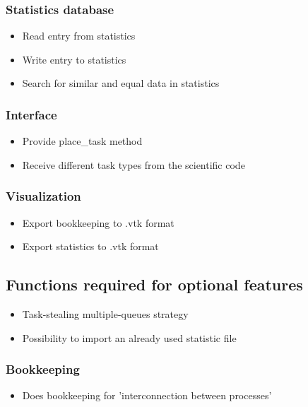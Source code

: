 {		\subsubsection{Statistics database}
	
			\begin{itemize}
				
				\item Read entry from statistics
				\item Write entry to statistics
				\item Search for similar and equal data in statistics
			\end{itemize}
	
	
	\subsubsection{Interface}
	
		\begin{itemize}
			\item Provide place\_task method
			\item Receive different task types from the scientific code
		\end{itemize}
		
		
	\subsubsection{Visualization}
	
		\begin{itemize}
			\item Export bookkeeping to .vtk format
			\item Export statistics to .vtk format
		\end{itemize}
		
	\subsection{Functions required for optional features}
	
		\begin{itemize}
			\item Task-stealing multiple-queues strategy%
			\item Possibility to import an already used statistic file%
		\end{itemize}
		
	\subsubsection{Bookkeeping}
		\begin{itemize}
			\item Does bookkeeping for 'interconnection between processes'
		\end{itemize}
		
}
